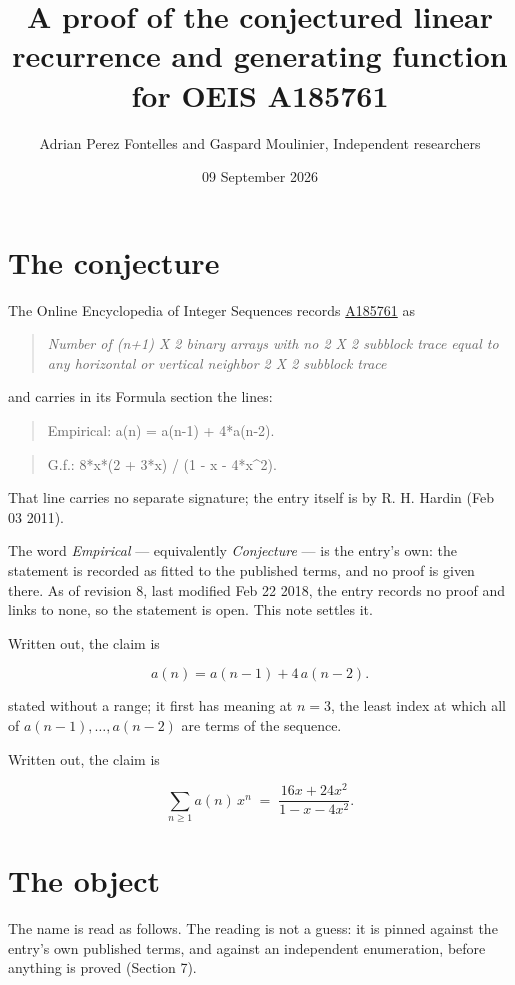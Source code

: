 \documentclass[11pt]{article}
\title{A proof of the conjectured linear recurrence and generating function for OEIS A185761}
\author{Adrian Perez Fontelles and Gaspard Moulinier, Independent researchers}
\date{09 September 2026}
\theoremstyle{definition}
\begin{document}
\maketitle
\section{The conjecture}

The Online Encyclopedia of Integer Sequences records \href{https://oeis.org/A185761}{A185761} as

\begin{quote}\itshape Number of (n+1) X 2 binary arrays with no 2 X 2 subblock trace equal to any horizontal or vertical neighbor 2 X 2 subblock trace\end{quote}

and carries in its Formula section the lines:

\begin{quote}\ttfamily Empirical: a(n) = a(n-1) + 4*a(n-2).\end{quote}

\begin{quote}\ttfamily G.f.: 8*x*(2 + 3*x) / (1 - x - 4*x\textasciicircum{}2).\end{quote}

That line carries no separate signature; the entry itself is by R. H. Hardin (Feb 03 2011).

The word {\itshape Empirical} --- equivalently {\itshape Conjecture} --- is the entry's own: the statement is recorded as fitted to the published terms, and no proof is given there. As of revision 8, last modified Feb 22 2018, the entry records no proof and links to none, so the statement is open. This note settles it.

Written out, the claim is

\[a(n) = a(n-1) + 4\,a(n-2).\]

stated without a range; it first has meaning at $n = 3$, the least index at which all of $a(n-1),\dots,a(n-2)$ are terms of the sequence.

Written out, the claim is

\[\sum_{n \ge 1} a(n)\,x^n \;=\; \frac{16x + 24x^{2}}{1 - x - 4x^{2}}.\]

\section{The object}

The name is read as follows. The reading is not a guess: it is pinned against the entry's own published terms, and against an independent enumeration, before anything is proved (Section 7).
\end{document}
